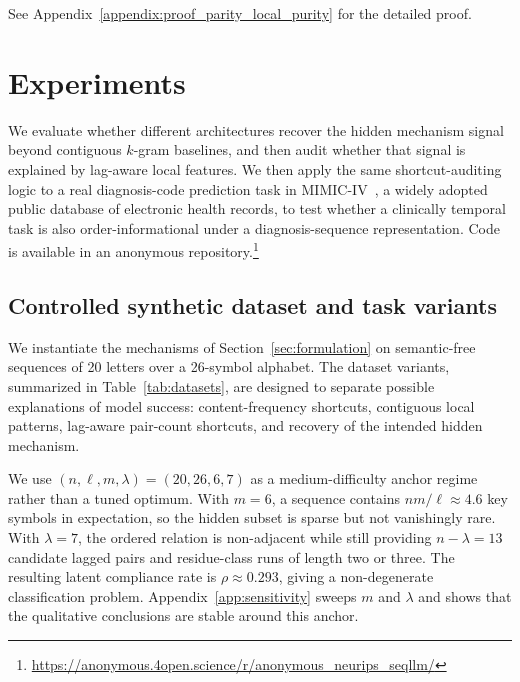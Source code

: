 \documentclass{article} %
\theoremstyle{plain}
\theoremstyle{definition}
\theoremstyle{remark}
\begin{document}
See Appendix~\ref{appendix:proof_parity_local_purity} for the detailed proof.

\section{Experiments}
\label{sec:experiments}

We evaluate whether different architectures recover the hidden mechanism signal beyond contiguous $k$-gram baselines, and then audit whether that signal is explained by lag-aware local features. We then apply the same shortcut-auditing logic to a real diagnosis-code prediction task in MIMIC-IV~\citep{johnson2023mimiciv}, a widely adopted public database of electronic health records, to test whether a clinically temporal task is also order-informational under a diagnosis-sequence representation. Code is available in an anonymous repository.\footnote{\url{https://anonymous.4open.science/r/anonymous_neurips_seqllm/}}

\subsection{Controlled synthetic dataset and task variants}
\label{sec:task_variants}

We instantiate the mechanisms of Section~\ref{sec:formulation} on semantic-free sequences of 20 letters over a 26-symbol alphabet. The dataset variants, summarized in Table~\ref{tab:datasets}, are designed to separate possible explanations of model success: content-frequency shortcuts, contiguous local patterns, lag-aware pair-count shortcuts, and recovery of the intended hidden mechanism.

We use $(n,\ell,m,\lambda)=(20,26,6,7)$ as a medium-difficulty anchor regime rather than a tuned optimum. With $m=6$, a sequence contains $nm/\ell \approx 4.6$ key symbols in expectation, so the hidden subset is sparse but not vanishingly rare. With $\lambda=7$, the ordered relation is non-adjacent while still providing $n-\lambda=13$ candidate lagged pairs and residue-class runs of length two or three. The resulting latent compliance rate is $\rho \approx 0.293$, giving a non-degenerate classification problem. Appendix~\ref{app:sensitivity} sweeps $m$ and $\lambda$ and shows that the qualitative conclusions are stable around this anchor.
\end{document}
